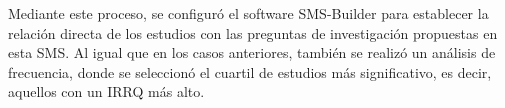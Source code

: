 Mediante este proceso, se configuró el software SMS-Builder \cite{sms-builder-repo} para establecer la relación directa de los estudios con las preguntas de investigación propuestas en esta SMS. Al igual que en los casos anteriores, también se realizó un análisis de frecuencia, donde se seleccionó el cuartil de estudios más significativo, es decir, aquellos con un IRRQ más alto.
